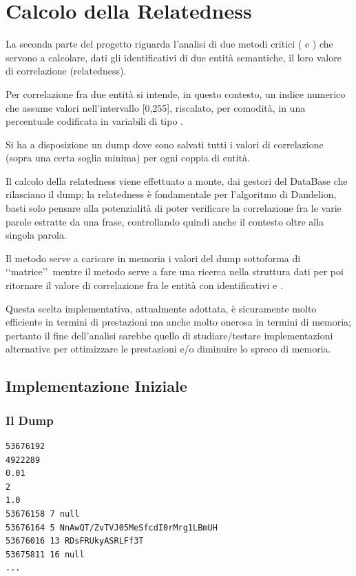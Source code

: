 \chapter{Calcolo della Relatedness}

La seconda parte del progetto riguarda l'analisi di due metodi critici ( e ) che servono a 
calcolare, dati gli identificativi di due entità semantiche, il loro valore di correlazione (relatedness). 

Per correlazione fra due entità si intende, in questo contesto, un indice numerico che assume valori nell'intervallo [0,255], 
riscalato, per comodità, in una percentuale codificata in variabili di tipo . 

Si ha a disposizione un dump dove sono salvati tutti i valori di correlazione (sopra una certa soglia minima) per ogni coppia di entità. 

Il calcolo della relatedness viene effettuato a monte,
dai gestori del DataBase che rilasciano il dump; la relatedness è fondamentale per l'algoritmo di Dandelion, basti solo pensare alla potenzialità 
di poter verificare la correlazione fra le varie parole estratte da una frase, controllando quindi anche il contesto oltre alla singola parola.

Il metodo  serve a caricare in memoria i valori del dump 
sottoforma di \lq\lq matrice\rq\rq\ mentre il metodo  serve a fare una ricerca nella struttura dati per poi ritornare il valore di 
correlazione fra le entità con identificativi  e .

Questa scelta implementativa, attualmente adottata, è sicuramente molto efficiente in termini di prestazioni ma anche molto onerosa in termini di memoria; 
pertanto il fine dell'analisi sarebbe quello di studiare/testare implementazioni alternative per ottimizzare le prestazioni e/o diminuire lo spreco di memoria.  

\section{Implementazione Iniziale}

\subsection{Il Dump}
\begin{lstlisting}[style=TeXStyle, caption=Estratto del dump]
53676192
4922289
0.01
2
1.0
53676158 7 null
53676164 5 NnAwQT/ZvTVJ05MeSfcdI0rMrg1LBmUH
53676016 13 RDsFRUkyASRLFf3T
53675811 16 null
...
\end{lstlisting}

